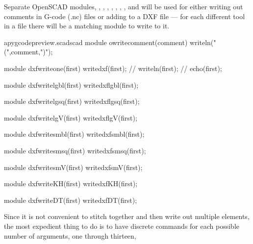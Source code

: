 \documentclass{ltxdoc}
\begin{document}
Separate OpenSCAD modules, 
, 
, 
, 
, 
, 
, 
, and
will be used for either writing out comments in G-code (.nc) files
or adding to a DXF file --- for each different tool in a file there will be a matching
module to write to it.
 
\lstset{firstnumber=\thepyscad}
\begin{writecode}{a}{pygcodepreview.scad}{scad}
module owritecomment(comment) {
    writeln("(",comment,")");
}

module dxfwriteone(first) {
    writedxf(first);
//    writeln(first);
//    echo(first);
}

module dxfwritelgbl(first) {
    writedxflgbl(first);
}

module dxfwritelgsq(first) {
    writedxflgsq(first);
}

module dxfwritelgV(first) {
    writedxflgV(first);
}

module dxfwritesmbl(first) {
    writedxfsmbl(first);
}

module dxfwritesmsq(first) {
    writedxfsmsq(first);
}

module dxfwritesmV(first) {
    writedxfsmV(first);
}

module dxfwriteKH(first) {
    writedxfKH(first);
}

module dxfwriteDT(first) {
    writedxfDT(first);
}

\end{writecode}
\addtocounter{pyscad}{42}
%

Since it is not convenient to stitch together and then write out multiple elements, 
the most expedient thing to do is to have discrete commands for each possible number
of arguments, one through thirteen, 
 
\end{document}
